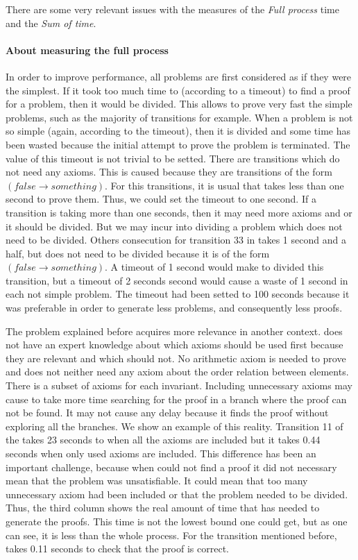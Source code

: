 There are some very relevant issues with the measures of the \textit{Full process} time and the \textit{Sum of \spass time}.

\paragraph{About measuring the full process}
In order to improve performance, all \spass problems are first considered as if they were the simplest. 
%
If it took too much time to \spass (according to a timeout) to find a proof for a problem, then it would be divided.
%
This allows to prove very fast the simple problems, such as the majority of \invDisjoint transitions for example. 
%
When a problem is not so simple (again, according to the timeout), then it is divided and some time has been wasted because the initial attempt to prove the problem is terminated.
%
The value of this timeout is not trivial to be setted.
%
There are transitions which do not need any axioms. 
%
This is caused because they are transitions of the form $(false \to something)$.
%
For this transitions, it is usual that \spass takes less than one second to prove them. 
%
Thus, we could set the timeout to one second. 
%
If a transition is taking more than one seconds, then it may need more axioms and or it should be divided.
%
But we may incur into dividing a problem which does not need to be divided. 
%
Others consecution for transition 33 in \invLock takes 1 second and a half, but does not need to be divided because it is of the form $(false \to something)$.
%
A timeout of 1 second would make \gandalf to divided this transition, but a timeout of 2 seconds second would cause a waste of 1 second in each not simple \spass problem.
%
The timeout had been setted to 100 seconds because it was preferable in order to generate less \spass problems, and consequently less proofs.

The problem explained before acquires more relevance in another context.
%
\spass does not have an expert knowledge about which axioms should be used first because they are relevant and which should not.
%
No arithmetic axiom is needed to prove \invRegion and \spass does not neither need any axiom about the order relation between elements. 
%
There is a subset of axioms for each invariant.
%
Including unnecessary axioms may cause \spass to take more time searching for the proof in a branch where the proof can not be found. 
%
It may not cause any delay because it finds the proof without exploring all the branches.
%
We show an example of this reality.
%
Transition 11 of the \invPreserve takes 23 seconds to \spass when all the axioms are included but it takes 0.44 seconds when only used axioms are included. 
%
This difference has been an important challenge, because when \spass could not find a proof it did not necessary mean that the problem was unsatisfiable. 
%
It could mean that too many unnecessary axiom had been included or that the problem needed to be divided.
%
Thus, the third column shows the real amount of time that \spass has needed to generate the proofs. 
%
This time is not the lowest bound one could get, but as one can see, it is less than the whole process.
%
For the transition mentioned before, \spass takes 0.11 seconds to check that the proof is correct.
